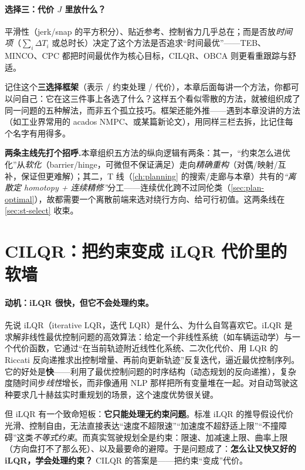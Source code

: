 \paragraph{选择三：代价 $J$ 里放什么？}
平滑性（jerk/snap 的平方积分）、贴近参考、控制省力几乎总在；而是否放\emph{时间项}（$\sum_i\Delta T_i$ 或总时长）决定了这个方法是否追求“时间最优”——TEB、MINCO、CPC 都把时间最优作为核心目标，CILQR、OBCA 则更看重跟踪与舒适。

\begin{insight}
记住这个\textbf{三选择框架}（表示 / 约束处理 / 代价），本章后面每讲一个方法，你都可以问自己：它在这三件事上各选了什么？这样五个看似零散的方法，就被组织成了同一问题的五种解法，而非五个孤立技巧。框架还能外推——遇到本章没讲的方法（如工业界常用的 acados NMPC、或某篇新论文），用同样三栏去拆，比记住每个名字有用得多。
\end{insight}

\begin{note}
\textbf{两条主线先打个招呼.}\;本章组织五方法的纵向逻辑有两条：其一，“约束怎么进优化”从\emph{软化}（barrier/hinge，可微但不保证满足）走向\emph{精确重构}（对偶/映射/互补，保证但更难解）；其二，T 线（\cref{ch:planning} 的搜索/走廊与本章）共有的\emph{“离散定 homotopy + 连续精修”}分工——连续优化跨不过同伦类（\cref{sec:plan-optimal}），故都需要一个离散前端来选对绕行方向、给可行初值。这两条线在 \cref{sec:st-select} 收束。
\end{note}

\section{CILQR：把约束变成 iLQR 代价里的软墙}
\label{sec:st-cilqr}

\paragraph{动机：iLQR 很快，但它不会处理约束。}
先说 iLQR（iterative LQR，迭代 LQR）是什么、为什么自驾喜欢它。iLQR 是求解非线性最优控制问题的高效算法：给定一个非线性系统（如车辆运动学）与一个代价函数，它通过“在当前轨迹附近线性化系统、二次化代价、用 LQR 的 Riccati 反向递推求出控制增量、再前向更新轨迹”反复迭代，逼近最优控制序列\cite{chen2017cilqr}。它的好处是\textbf{快}——利用了最优控制问题的时序结构（动态规划的反向递推），复杂度随时间步\emph{线性}增长，而非像通用 NLP 那样把所有变量堆在一起。对自动驾驶这种要求几十赫兹实时重规划的场景，这个速度优势很关键。

但 iLQR 有一个致命短板：\textbf{它只能处理无约束问题}。标准 iLQR 的推导假设代价光滑、控制自由，无法直接表达“速度不超限速”“加速度不超舒适上限”“不撞障碍”这类\emph{不等式约束}。而真实驾驶规划全是约束：限速、加减速上限、曲率上限（方向盘打不了那么死）、以及最要命的避障。于是问题成了：\textbf{怎么让又快又好的 iLQR，学会处理约束？} CILQR 的答案是——把约束“变成”代价。

